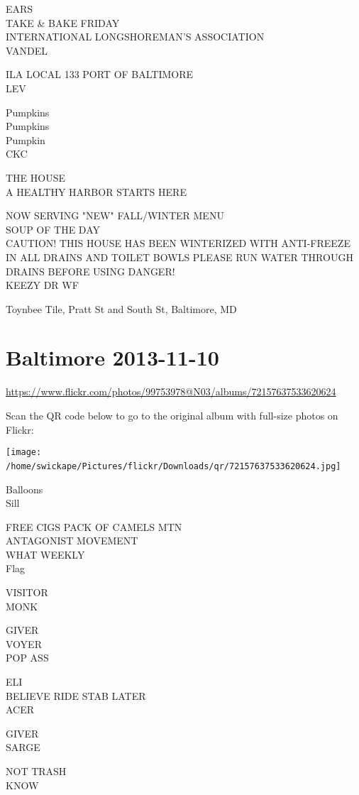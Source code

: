 \documentclass[10pt,letterpaper]{article}
\begin{document}
EARS\\
TAKE \& BAKE FRIDAY\\
INTERNATIONAL LONGSHOREMAN'S ASSOCIATION\\
VANDEL

ILA LOCAL 133 PORT OF BALTIMORE\\
LEV

Pumpkins\\
Pumpkins\\
Pumpkin\\
CKC

THE HOUSE\\
A HEALTHY HARBOR STARTS HERE

NOW SERVING "NEW" FALL/WINTER MENU\\
SOUP OF THE DAY\\
CAUTION! THIS HOUSE HAS BEEN WINTERIZED WITH ANTI{-}FREEZE IN ALL DRAINS AND TOILET BOWLS PLEASE RUN WATER THROUGH DRAINS BEFORE USING DANGER!\\
KEEZY DR WF

Toynbee Tile, Pratt St and South St, Baltimore, MD
\

\section*{Baltimore 2013-11-10}

\url{https://www.flickr.com/photos/99753978@N03/albums/72157637533620624}

Scan the QR code below to go to the original album with full-size photos on Flickr:

\texttt{[image: /home/swickape/Pictures/flickr/Downloads/qr/72157637533620624.jpg]}
\

Balloons\\
Sill

FREE CIGS PACK OF CAMELS MTN\\
ANTAGONIST MOVEMENT\\
WHAT WEEKLY\\
Flag

VISITOR\\
MONK

GIVER\\
VOYER\\
POP ASS

ELI\\
BELIEVE RIDE STAB LATER\\
ACER

GIVER\\
SARGE

NOT TRASH\\
KNOW
\end{document}
